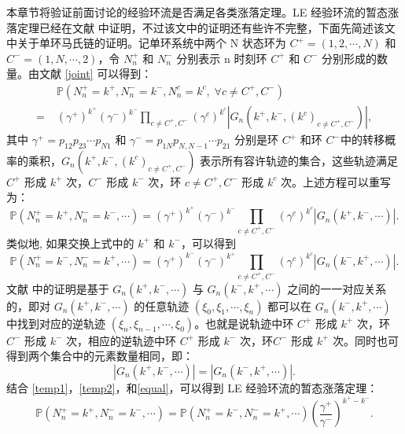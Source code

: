 
本章节将验证前面讨论的经验环流是否满足各类涨落定理。LE 经验环流的暂态涨落定理已经在文献 \cite{andrieux2007network} 中证明，不过该文中的证明还有些许不完整，下面先简述该文中关于单环马氏链的证明。记单环系统中两个 N 状态环为  $C^+ = (1,2,\cdots,N)$ 和 $C^- = (1,N,\cdots,2)$，令 $N^+_n$ 和 $N^-_n$ 分别表示 n 时刻环  $C^+$ 和 $C^-$ 分别形成的数量。由文献 \eqref{joint} 可以得到：
\begin{align*}
    &\;\mathbb{P}\left(N^+_n=k^+,N^-_n=k^-,N^c_n=k^c,\;\forall c\neq C^+,C^-\right)\\
    =&\; (\gamma^+)^{k^+}(\gamma^-)^{k^-}\prod_{c\neq C^+,C^-}
    \left(\gamma^c\right)^{k^c}\left|G_n(k^+,k^-,(k^c)_{c\neq C^+,C^-})\right|,
\end{align*}
其中 $\gamma^+ = p_{12}p_{23}\cdots p_{N1}$ 和 $\gamma^- = p_{1N}p_{N,N-1}\cdots p_{21}$ 分别是环 $C^+$ 和环 $C^-$中的转移概率的乘积，$G_n(k^+,k^-,(k^c)_{c\neq C^+,C^-})$ 表示所有容许轨迹的集合，这些轨迹满足 $C^+$ 形成 $k^+$ 次，$C^-$ 形成 $k^-$ 次，环 $c\neq C^+,C^-$ 形成 $k^c$ 次。上述方程可以重写为：
\begin{equation}\label{temp1}
    \mathbb{P}\left(N^+_n=k^+,N^-_n=k^-,\cdots\right)
    = (\gamma^+)^{k^+}(\gamma^-)^{k^-}\prod_{c\neq C^+,C^-}\left(\gamma^c\right)^{k^c}|G_n(k^+,k^-,\cdots)|.
\end{equation}
类似地, 如果交换上式中的 $k^+$ 和 $k^-$，可以得到
\begin{equation}\label{temp2}
\mathbb{P}\left(N^+_n=k^-,N^-_n=k^+,\cdots\right)
= (\gamma^+)^{k^-}(\gamma^-)^{k^+}\prod_{c\neq C^+,C^-}\left(\gamma^c\right)^{k^c}|G_n(k^-,k^+,\cdots)|.
\end{equation}
文献 \cite{andrieux2007network} 中的证明是基于 $G_n(k^+,k^-,\cdots)$ 与
$G_n(k^-,k^+,\cdots)$ 之间的一一对应关系的，即对 $G_n(k^+,k^-,\cdots)$ 的任意轨迹 $(\xi_0,\xi_1,\cdots,\xi_n)$ 都可以在 $G_n(k^-,k^+,\cdots)$ 中找到对应的逆轨迹  $(\xi_n,\xi_{n-1},\cdots,\xi_0)$。也就是说轨迹中环 $C^+$ 形成 $k^+$ 次，环$C^-$ 形成 $k^-$ 次，相应的逆轨迹中环 $C^+$ 形成 $k^-$ 次，环$C^-$ 形成 $k^+$ 次。同时也可得到两个集合中的元素数量相同，即：
\begin{equation}\label{equal}
    |G_n(k^+,k^-,\cdots)| = |G_n(k^-,k^+,\cdots)|.
\end{equation}
结合 \eqref{temp1}，\eqref{temp2}，和\eqref{equal}，可以得到 LE 经验环流的暂态涨落定理：
\begin{equation}\label{theorem:transient fluatuation}
	\mathbb{P}\left(N^+_n=k^+,N^-_n=k^-,\cdots\right)
	= \mathbb{P}\left(N^+_n=k^-,N^-_n=k^+,\cdots\right)\left(\frac{\gamma^+}{\gamma^-}\right)^{k^+-k^-}.
\end{equation}
